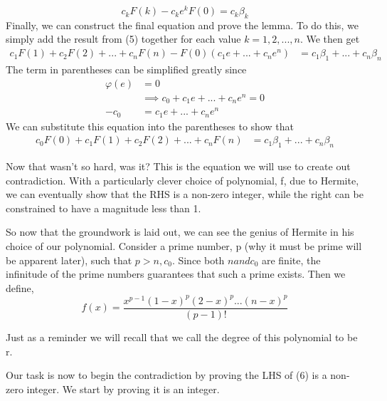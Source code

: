 \documentclass{article}
\begin{document}
\begin{equation}
    c_{k}F(k)-c_{k}e^{k}F(0)=c_{k}\beta_k
\end{equation}
Finally, we can construct the final equation and prove the lemma. To do this, we simply add the result from (5) together for each value $k=1,2,...,n$. We then get
\begin{equation*}
    \begin{split}
        c_{1}F(1)+c_2F(2)+...+c_{n}F(n)-F(0)(c_{1}e+...+c_{n}e^n)&=c_{1}\beta_{1}+...+c_{n}\beta_{n}
    \end{split}
\end{equation*}
The term in parentheses can be simplified greatly since
\begin{equation*}
    \begin{split}
    \varphi(e)&=0 \\
    &\implies c_0+c_1e+...+c_ne^n=0 \\
   -c_0 &=c_1e+...+c_ne^n
    \end{split}
\end{equation*}
We can substitute this equation into the parentheses to show that
\begin{equation}
    \begin{split}
        c_0F(0)+c_{1}F(1)+c_2F(2)+...+c_{n}F(n)&=c_{1}\beta_{1}+...+c_{n}\beta_{n}
    \end{split}
\end{equation}
\par
Now that wasn't so hard, was it? This is the equation we will use to create out contradiction. With a particularly clever choice of polynomial, f, due to Hermite, we can eventually show that the RHS is a non-zero integer, while the right can be constrained to have a magnitude less than 1. 
\par
So now that the groundwork is laid out, we can see the genius of Hermite in his choice of our polynomial. Consider a prime number, p (why it must be prime will be apparent later), such that $p>n,c_0$. Since both $n and c_0$ are finite, the infinitude of the prime numbers guarantees that such a prime exists. Then we define,
\begin{equation}
    f(x)=\frac{x^{p-1}(1-x)^p(2-x)^p...(n-x)^p}{(p-1)!}
\end{equation}  \par
Just as a reminder we will recall that we call the degree of this polynomial to be r.\par 
Our task is now to begin the contradiction by proving the LHS of (6) is a non-zero integer. We start by proving it is an integer.
\end{document}
